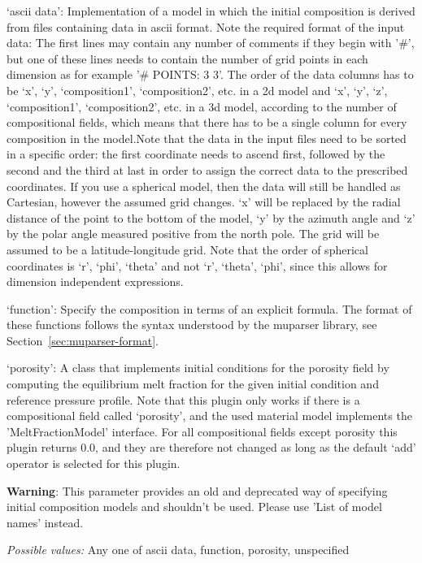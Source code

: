 \begin{itemize}
`ascii data': Implementation of a model in which the initial composition is derived from files containing data in ascii format. Note the required format of the input data: The first lines may contain any number of comments if they begin with '\#', but one of these lines needs to contain the number of grid points in each dimension as for example '\# POINTS: 3 3'. The order of the data columns has to be `x', `y', `composition1', `composition2', etc. in a 2d model and `x', `y', `z', `composition1', `composition2', etc. in a 3d model, according to the number of compositional fields, which means that there has to be a single column for every composition in the model.Note that the data in the input files need to be sorted in a specific order: the first coordinate needs to ascend first, followed by the second and the third at last in order to assign the correct data to the prescribed coordinates. If you use a spherical model, then the data will still be handled as Cartesian, however the assumed grid changes. `x' will be replaced by the radial distance of the point to the bottom of the model, `y' by the azimuth angle and `z' by the polar angle measured positive from the north pole. The grid will be assumed to be a latitude-longitude grid. Note that the order of spherical coordinates is `r', `phi', `theta' and not `r', `theta', `phi', since this allows for dimension independent expressions.

`function': Specify the composition in terms of an explicit formula. The format of these functions follows the syntax understood by the muparser library, see Section~\ref{sec:muparser-format}.

`porosity': A class that implements initial conditions for the porosity field by computing the equilibrium melt fraction for the given initial condition and reference pressure profile. Note that this plugin only works if there is a compositional field called `porosity', and the used material model implements the 'MeltFractionModel' interface. For all compositional fields except porosity this plugin returns 0.0, and they are therefore not changed as long as the default `add' operator is selected for this plugin.

\textbf{Warning}: This parameter provides an old and deprecated way of specifying initial composition models and shouldn't be used. Please use 'List of model names' instead.


{\it Possible values:} Any one of ascii data, function, porosity, unspecified
\end{itemize}



